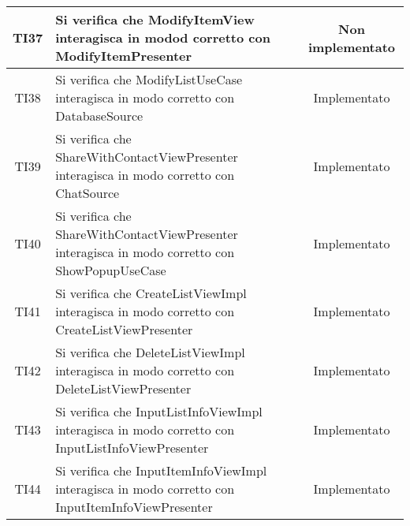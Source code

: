 \begin{center}
\begin{longtable}{|c|>{\centering}m{10cm}|c|}
		TI37 & Si verifica che ModifyItemView interagisca in modod corretto con ModifyItemPresenter & Non implementato \\ \hline
		TI38 & Si verifica che ModifyListUseCase interagisca in modo corretto con DatabaseSource & Implementato \\ \hline
		TI39 & Si verifica che ShareWithContactViewPresenter interagisca in modo corretto con ChatSource & Implementato \\ \hline
		TI40 & Si verifica che ShareWithContactViewPresenter interagisca in modo corretto con ShowPopupUseCase & Implementato \\ \hline
		TI41 & Si verifica che CreateListViewImpl interagisca in modo corretto con CreateListViewPresenter & Implementato \\ \hline
		TI42 & Si verifica che DeleteListViewImpl interagisca in modo corretto con DeleteListViewPresenter & Implementato \\ \hline
		TI43 & Si verifica che InputListInfoViewImpl interagisca in modo corretto con InputListInfoViewPresenter & Implementato \\ \hline
		TI44 & Si verifica che InputItemInfoViewImpl interagisca in modo corretto con InputItemInfoViewPresenter & Implementato \\ \hline
	\end{longtable}
\end{center}
